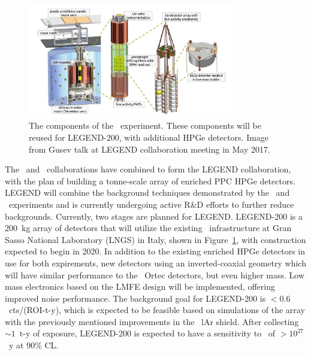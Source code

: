 \documentclass[/main.tex]{subfiles}
\begin{document}
\begin{figure}
  \centering
  \includegraphics[width=0.8\textwidth]{legend200}
  \caption[\Gerda\ experimental design]{\label{fig:legend200}
    The components of the \Gerda\ experiment. These components will be reused for LEGEND-200, with additional HPGe detectors. Image from Gusev talk at LEGEND collaboration meeting in May 2017.
  }
\end{figure}
The \MJ\ and \Gerda\ collaborations have combined to form the LEGEND collaboration, with the plan of building a tonne-scale array of enriched PPC HPGe detectors\cite{legend}.
LEGEND will combine the background techniques demonstrated by the \MJD\ and \Gerda\ experiments and is currently undergoing active R\&D efforts to further reduce backgrounds.
Currently, two stages are planned for LEGEND.
LEGEND-200 is a 200~kg array of detectors that will utilize the existing \Gerda\ infrastructure at Gran Sasso National Laboratory (LNGS) in Italy, shown in Figure~\ref{fig:legend200}, with construction expected to begin in 2020.
In addition to the existing enriched HPGe detectors in use for both expirements, new detectors using an inverted-coaxial geometry which will have similar performance to the \MJD\ Ortec detectors, but even higher mass.
Low mass electronics based on the LMFE design will be implemented, offering improved noise performance.
The background goal for LEGEND-200 is $<0.6$~cts/(ROI-t-y), which is expected to be feasible based on simulations of the array with the previously mentioned improvements in the \Gerda\ lAr shield.
After collecting ${\sim}1$~t-y of exposure, LEGEND-200 is expected to have a sensitivity to  \znbb\ of $>10^{27}$~y at 90\% CL.
\end{document}
